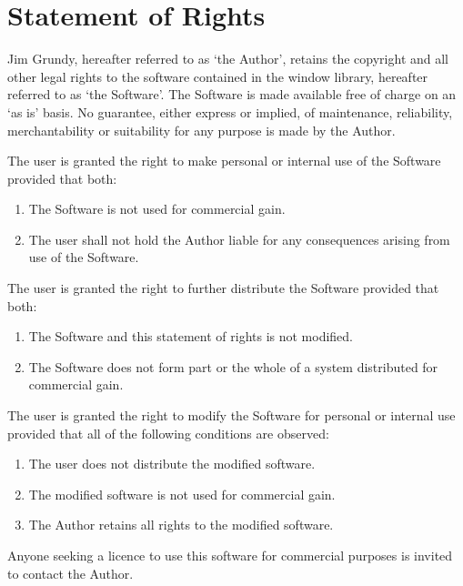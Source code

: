\newcommand{\hand}{\tt/\symbol{"5C}}
\newcommand{\hor}{\tt\symbol{"5C}/}
\newcommand{\hnot}{\tt\symbol{"7E}}

\newcommand{\nn}[1]{#1n}


\chapter{Statement of Rights}

Jim Grundy, hereafter referred to as `the Author', retains the
copyright and all other legal rights to the software contained in
the window library, hereafter referred to as `the Software'.
The Software is made available free of charge on an `as is' basis.
No guarantee, either express or implied, of maintenance, reliability,
merchantability or suitability for any purpose is made by the Author.

The user is granted the right to make personal or internal use
of the Software provided that both:
\begin{enumerate}
    \item   The Software is not used for commercial gain.
    \item   The user shall not hold the Author liable for any consequences
            arising from use of the Software.
\end{enumerate}
The user is granted the right to further distribute the Software
provided that both:
\begin{enumerate}
    \item   The Software and this statement of rights is not modified.
    \item   The Software does not form part or the whole of a system
            distributed for commercial gain.
\end{enumerate}
The user is granted the right to modify the Software for personal or
internal use provided that all of the following conditions are
observed:
\begin{enumerate}
    \item   The user does not distribute the modified software.
    \item   The modified software is not used for commercial gain.
    \item   The Author retains all rights to the modified software.
\end{enumerate}

Anyone seeking a licence to use this software for commercial purposes
is invited to contact the Author.

